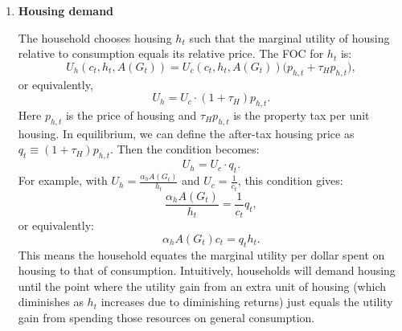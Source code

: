 \begin{enumerate}
    \begin{equation}
        \kappa\bigl(1+\phi(G_t)\bigr)^{1+\theta}n_t^{\theta} = \frac{(1-\tau_L)w_t}{c_t};\label{eq:labor}
    \end{equation}

    \begin{equation}
            n_t \;=\;\Biggl[\,
            \frac{(1-\tau_L)\,w_t}
                {\kappa\,c_t\,\bigl(1+\phi(G_t)\bigr)^{1+\theta}}
            \Biggr]^{\!1/\theta}\!
    \end{equation}

    Intuitively, the marginal rate of substitution between leisure (or time) and consumption equals the real after-tax wage. An increase in commuting factor $\phi(G_t)$ (worse roads) raises the left-hand side (effective disutility of labor), leading the household to supply less labor for a given wage. This aligns with the idea that poor road quality reduces effective labor supply (households require higher compensation to work the same hours because commuting erodes their usable time).

  \item \textbf{Housing demand}

    The household chooses housing $h_t$ such that the marginal utility of housing relative to consumption equals its relative price. The FOC for $h_t$ is:
    \begin{equation}
    U_h(c_t, h_t, A(G_t)) = U_c(c_t, h_t, A(G_t)) \bigl(p_{h,t} + \tau_H p_{h,t}\bigr),
    \end{equation}
    or equivalently,
    \begin{equation}
    U_h = U_c \cdot (1+\tau_H)p_{h,t}.
    \end{equation}
    Here $p_{h,t}$ is the price of housing and $\tau_H p_{h,t}$ is the property tax per unit housing. In equilibrium, we can define the after-tax housing price as $q_t \equiv (1+\tau_H)p_{h,t}$. Then the condition becomes:
    \begin{equation}
    U_h = U_c \cdot q_t.
    \end{equation}
    For example, with $U_h = \frac{\alpha_h A(G_t)}{h_t}$ and $U_c = \frac{1}{c_t}$, this condition gives:
    \begin{equation}
    \frac{\alpha_h A(G_t)}{h_t} = \frac{1}{c_t}q_t,
    \end{equation}
    or equivalently:
    \begin{equation}
    \alpha_h A(G_t) c_t = q_t h_t.
    \end{equation}
    This means the household equates the marginal utility per dollar spent on housing to that of consumption. Intuitively, households will demand housing until the point where the utility gain from an extra unit of housing (which diminishes as $h_t$ increases due to diminishing returns) just equals the utility gain from spending those resources on general consumption.


\end{enumerate}
